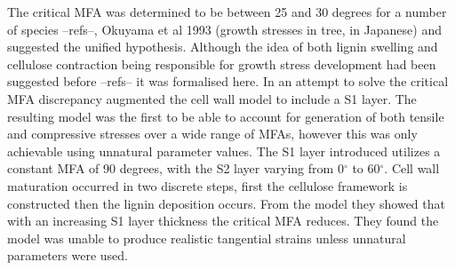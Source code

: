 The critical MFA was determined to be between
25 and 30 degrees for a number of species --refs--, Okuyama et al 1993 (growth
stresses in tree, in Japanese) and \cite{ISI:A1995QJ03000001} suggested the
unified hypothesis. Although the idea of both lignin swelling and cellulose
contraction being responsible for growth stress development had been suggested
before --refs-- it was formalised here. In an attempt to solve the critical MFA
discrepancy \cite{ISI:A1995QJ03000001} augmented the \cite{Barber_1964} cell wall
model to include a S1 layer. The resulting model was the first to be able to
account for generation of both tensile and compressive stresses over a wide
range of MFAs, however this was only achievable using unnatural parameter values. The S1 layer introduced utilizes a constant MFA
of 90 degrees, with the S2 layer varying from 0$^{\circ}$ to 60$^{\circ}$. Cell wall maturation
occurred in two discrete steps, first the cellulose framework is constructed then
the lignin deposition occurs. From the model they showed that with an
increasing S1 layer thickness the critical MFA reduces. They found the model
was unable to produce realistic tangential strains unless unnatural parameters
were used.